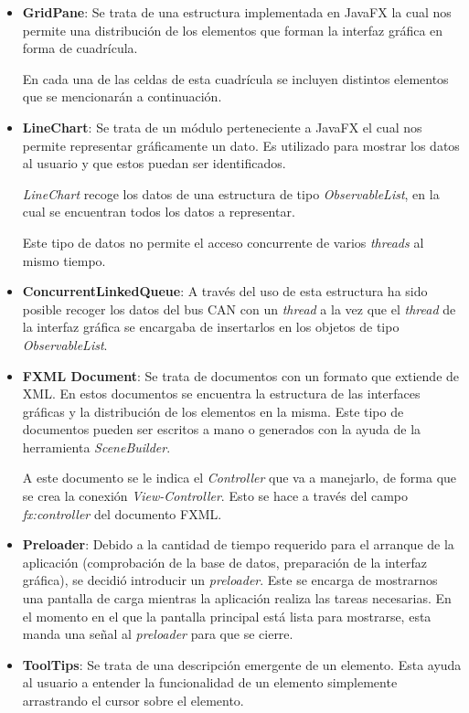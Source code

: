 \begin{itemize}
\item
\textbf{GridPane}: Se trata de una estructura implementada en JavaFX la cual nos permite una distribución de los elementos que forman la interfaz gráfica en forma de cuadrícula.

En cada una de las celdas de esta cuadrícula se incluyen distintos elementos que se mencionarán a continuación.
\item
\textbf{LineChart}: Se trata de un módulo perteneciente a JavaFX el cual nos permite representar gráficamente un dato. Es utilizado para mostrar los datos al usuario y que estos puedan ser identificados.

\emph{LineChart} recoge los datos de una estructura de tipo \emph{ObservableList}, en la cual se encuentran todos los datos a representar.

Este tipo de datos no permite el acceso concurrente de varios \emph{threads} al mismo tiempo.


\item
\textbf{ConcurrentLinkedQueue}: A través del uso de esta estructura ha sido posible recoger los datos del bus CAN con un \emph{thread} a la vez que el \emph{thread} de la interfaz gráfica se encargaba de insertarlos en los objetos de tipo \emph{ObservableList}.
\item
\textbf{FXML Document}: Se trata de documentos con un formato que extiende de XML. En estos documentos se encuentra la estructura de las interfaces gráficas y la distribución de los elementos en la misma. Este tipo de documentos pueden ser escritos a mano o generados con la ayuda de la herramienta \emph{SceneBuilder}.

A este documento se le indica el \emph{Controller} que va a manejarlo, de forma que se crea la conexión \emph{View-Controller}. Esto se hace a través del campo \emph{fx:controller} del documento FXML.
\item
\textbf{Preloader}: Debido a la cantidad de tiempo requerido para el arranque de la aplicación (comprobación de la base de datos, preparación de la interfaz gráfica), se decidió introducir un \emph{preloader}. Este se encarga de mostrarnos una pantalla de carga mientras la aplicación realiza las tareas necesarias. En el momento en el que la pantalla principal está lista para mostrarse, esta manda una señal al \emph{preloader} para que se cierre.

\item
\textbf{ToolTips}: Se trata de una descripción emergente de un elemento. Esta ayuda al usuario a entender la funcionalidad de un elemento simplemente arrastrando el cursor sobre el elemento.


\end{itemize}


